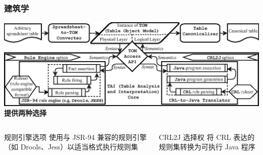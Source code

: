 \documentclass[10pt]{beamer}
\begin{document}
\begin{frame}
\frametitle{建筑学}
\includegraphics[width=1.0\linewidth]{architecture}
\hspace*{\fill} \textbf{提供两种选择} \hspace*{\fill}
\begin{columns}
\begin{block}{\small 规则引擎选项}
\small 使用与 JSR-94 兼容的规则引擎（如 Drools、Jess）以适当格式执行规则集
\end{block}
\begin{block}{\small CRL2J 选择权}
\small 将 CRL 表达的规则集转换为可执行 Java 程序
\end{block}
\end{columns}
\end{frame}



\end{document}
